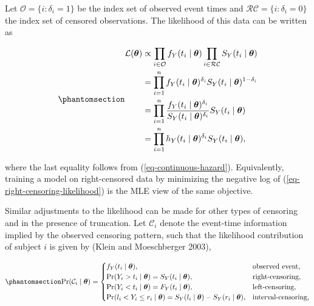 \documentclass[
  letterpaper,
  krantz2]{style/krantz}
\begin{document}
Let \(\mathcal{O}= \{i:\delta_i = 1\}\) be the index set of observed
event times and \(\mathcal{RC} = \{i:\delta_i = 0\}\) the index set of
censored observations. The likelihood of this data can be written as

\begin{equation}\phantomsection\label{eq-right-censoring-likelihood}{
\begin{aligned}
\mathcal{L}(\boldsymbol{\theta})
  & \propto \prod_{i \in \mathcal{O}}f_Y(t_i \mid \boldsymbol{\theta})\prod_{i \in \mathcal{RC}}S_Y(t_i \mid \boldsymbol{\theta})\\
  & = \prod_{i=1}^n f_Y(t_i \mid \boldsymbol{\theta})^{\delta_i}S_Y(t_i \mid \boldsymbol{\theta})^{1-\delta_i}\\
  & = \prod_{i=1}^n \frac{f_Y(t_i \mid \boldsymbol{\theta})^{\delta_i}}{S_Y(t_i \mid \boldsymbol{\theta})^{\delta_i}}S_Y(t_i \mid \boldsymbol{\theta})\\
  & = \prod_{i=1}^n h_Y(t_i \mid \boldsymbol{\theta})^{\delta_i}S_Y(t_i \mid \boldsymbol{\theta}),
\end{aligned}
}\end{equation}

where the last equality follows from (\ref{eq-continuous-hazard}).
Equivalently, training a model on right-censored data by minimizing the
negative log of (\ref{eq-right-censoring-likelihood}) is the MLE view of
the same objective.

Similar adjustments to the likelihood can be made for other types of
censoring and in the presence of
truncation. Let \(\mathcal{C}_i\)
denote the event-time information implied by the observed censoring
pattern, such that the likelihood contribution of subject \(i\) is given
by (Klein and Moeschberger 2003),

\begin{equation}\phantomsection\label{eq-likelihood-censoring}{
\Pr(\mathcal{C}_i \mid \boldsymbol{\theta}) =
\begin{cases}
f_Y(t_i \mid \boldsymbol{\theta}),  & \text{observed event}, \\
\Pr(Y_i > t_i \mid \boldsymbol{\theta}) = S_Y(t_i \mid \boldsymbol{\theta}),  & \text{right-censoring}, \\
\Pr(Y_i < t_i \mid \boldsymbol{\theta}) = F_Y(t_i \mid \boldsymbol{\theta}),  & \text{left-censoring}, \\
\Pr(l_i < Y_i \leq r_i \mid \boldsymbol{\theta}) = S_Y(l_i \mid \boldsymbol{\theta}) - S_Y(r_i \mid \boldsymbol{\theta}),  & \text{interval-censoring},
\end{cases}
}\end{equation}
\end{document}
